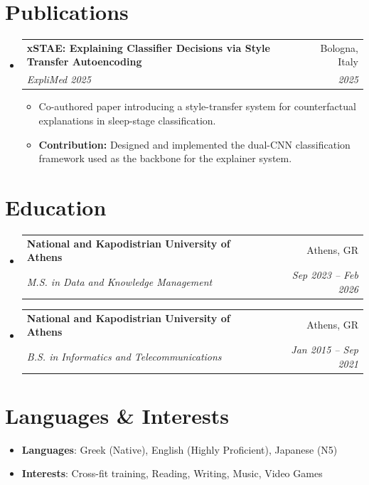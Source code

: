\documentclass[letterpaper,10pt]{article}
\makeatletter
\newcommand{\resumeItem}[1]{\item\small{#1}}
\newcommand{\resumeSubheading}[4]{
\vspace{-1pt}\item
  \begin{tabular*}{0.97\textwidth}[t]{l@{\extracolsep{\fill}}r}
    \textbf{#1} & #2 \\
    \textit{#3} & \textit{#4} \\
  \end{tabular*}\vspace{-7pt}
}
\newcommand{\resumeSubHeadingList}{\begin{itemize}[leftmargin=0.15in, label={}]}
\newcommand{\resumeSubHeadingListEnd}{\end{itemize}}
\makeatother
\begin{document}
\section{Publications}
\resumeSubHeadingList
  \resumeSubheading
      {xSTAE: Explaining Classifier Decisions via Style Transfer Autoencoding}{Bologna, Italy}
      {ExpliMed 2025}{2025}
      \resumeSubHeadingList
          \resumeItem{Co-authored paper introducing a style-transfer system for counterfactual explanations in sleep-stage classification.}
          \resumeItem{\textbf{Contribution:} Designed and implemented the dual-CNN classification framework used as the backbone for the explainer system.}
      \resumeSubHeadingListEnd
\resumeSubHeadingListEnd

\section{Education}
\resumeSubHeadingList
  \resumeSubheading
      {National and Kapodistrian University of Athens}{Athens, GR}
      {M.S. in Data and Knowledge Management}{Sep 2023 -- Feb 2026}
  \resumeSubheading
      {National and Kapodistrian University of Athens}{Athens, GR}
      {B.S. in Informatics and Telecommunications}{Jan 2015 -- Sep 2021}
\resumeSubHeadingListEnd

\section{Languages \& Interests}
  \resumeSubHeadingList
    \resumeItem{\textbf{Languages}: Greek (Native), English (Highly Proficient)}, Japanese (N5)
    \resumeItem{\textbf{Interests}: Cross-fit training, Reading, Writing, Music, Video Games}
  \resumeSubHeadingListEnd
\end{document}
